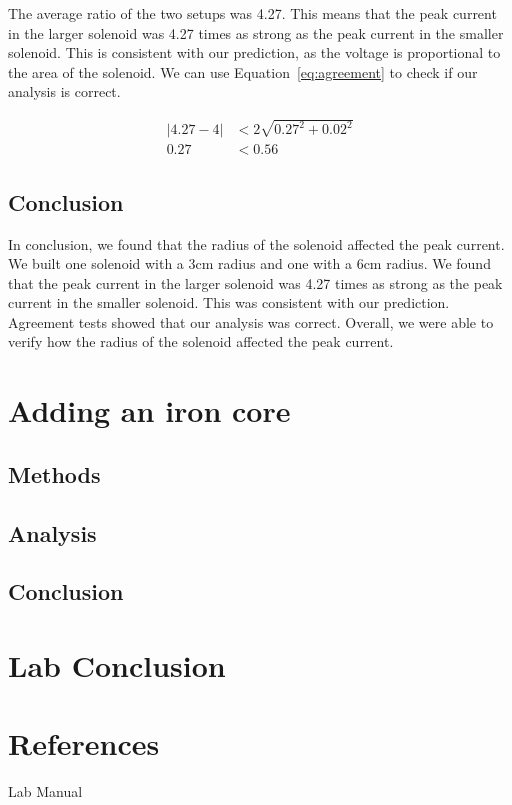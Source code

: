 \documentclass[11pt]{article}
\let\oldsection\section
\renewcommand\section{\clearpage\oldsection}
\begin{document}
    The average ratio of the two setups was 4.27.
    This means that the peak current in the larger solenoid was 4.27 times as strong as the peak current in the smaller solenoid.
    This is consistent with our prediction, as the voltage is proportional to the area of the solenoid.
    We can use Equation~\ref{eq:agreement} to check if our analysis is correct.

    \begin{align*}
        |4.27 - 4| &< 2 \sqrt{0.27^2 + 0.02^2} \\
        0.27 &< 0.56
    \end{align*}

    \subsection{Conclusion}\label{subsec:part_2_conclusion}

    In conclusion, we found that the radius of the solenoid affected the peak current.
    We built one solenoid with a 3cm radius and one with a 6cm radius.
    We found that the peak current in the larger solenoid was 4.27 times as strong as the peak current in the smaller solenoid.
    This was consistent with our prediction.
    Agreement tests showed that our analysis was correct.
    Overall, we were able to verify how the radius of the solenoid affected the peak current.

    \section{Adding an iron core}\label{sec:part_3}

    \subsection{Methods}\label{subsec:part_3_methods}

    \subsection{Analysis}\label{subsec:part_3_analsysis}

    \subsection{Conclusion}\label{subsec:part_3_conclusion}


    \section{Lab Conclusion}\label{sec:lab_conclusion}



    \appendix
    \section{References}\label{sec:references}

    Lab Manual
\end{document}
